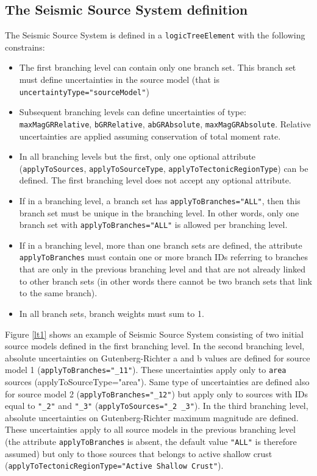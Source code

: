 \subsection{The Seismic Source System definition}
The Seismic Source System is defined in a \Verb+logicTreeElement+ with the following constrains:
\begin{itemize}
\item The first branching level can contain only one branch set. This branch set must define uncertainties in the source model (that is \Verb+uncertaintyType="sourceModel"+)
\item Subsequent branching levels can define uncertainties of type: \Verb+maxMagGRRelative+, \Verb+bGRRelative+, \Verb+abGRAbsolute+, \Verb+maxMagGRAbsolute+. Relative uncertainties are applied assuming conservation of total moment rate.
\item In all branching levels but the first, only one optional attribute (\Verb+applyToSources+, \Verb+applyToSourceType+, \Verb+applyToTectonicRegionType+) can be defined. The first branching level does not accept any optional attribute.
\item If in a branching level, a branch set has \Verb+applyToBranches="ALL"+, then this branch set must be unique in the branching level. In other words, only one branch set with \Verb+applyToBranches="ALL"+ is allowed per branching level.
\item If in a branching level, more than one branch sets are defined, the attribute \Verb+applyToBranches+ must contain one or more branch IDs referring to branches that are only in the previous branching level and that are not already linked to other branch sets (in other words there cannot be two branch sets that link to the same branch).
\item In all branch sets, branch weights must sum to 1.
\end{itemize}
Figure \ref{lt1} shows an example of Seismic Source System consisting of two initial source models defined in the first branching level. In the second branching level, absolute uncertainties on Gutenberg-Richter a and b values are defined for source model 1 (\Verb+applyToBranches="_11"+). These uncertainties apply only to \Verb+area+ sources (applyToSourceType="area"). Same type of uncertainties are defined also for source model 2 (\Verb+applyToBranches="_12"+) but apply only to sources with IDs equal to \Verb+"_2"+ and \Verb+"_3"+ (\Verb+applyToSources="_2 _3"+). In the third branching level, absolute uncertainties on Gutenberg-Richter maximum magnitude are defined. These uncertainties apply to all source models in the previous branching level (the attribute \Verb+applyToBranches+ is absent, the default value \Verb+"ALL"+ is therefore assumed) but only to those sources that belongs to active shallow crust\\ (\Verb+applyToTectonicRegionType="Active Shallow Crust"+).
